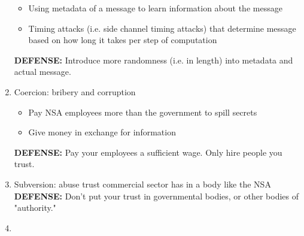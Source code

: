 \documentclass[11pt]{article}
\begin{document}
\begin{enumerate}
\begin{itemize}
	\item Using metadata of a message to learn information about the message
	\item Timing attacks (i.e. side channel timing attacks) that determine message based on how long it takes per step of computation
	\end{itemize}
	\textbf{DEFENSE: } Introduce more randomness (i.e. in length) into metadata and actual message.
\item Coercion: bribery and corruption
	\begin{itemize}
	\item Pay NSA employees more than the government to spill secrets
	\item Give money in exchange for information
	\end{itemize}
	\textbf{DEFENSE: } Pay your employees a sufficient wage. Only hire people you trust.
\item Subversion: abuse trust commercial sector has in a body like the NSA
\textbf{DEFENSE: } Don't put your trust in governmental bodies, or other bodies of "authority."
\item 

\end{enumerate}
\end{document}
